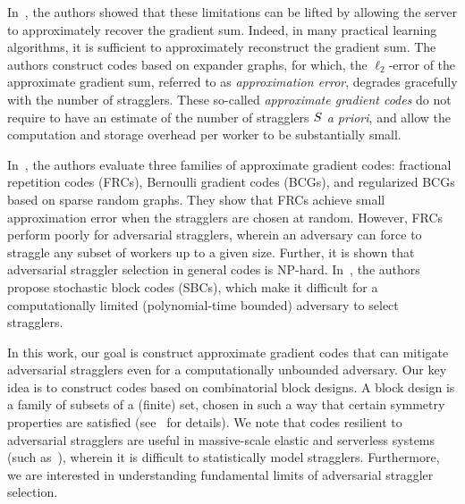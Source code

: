 \documentclass[conference,letterpaper]{IEEEtran}
\begin{document}
In~\cite{Raviv:18}, the authors showed that these limitations can be lifted by allowing the server to approximately recover the gradient sum.
Indeed, in many practical learning algorithms, it is sufficient to approximately reconstruct the gradient sum. 
The authors construct codes based on expander graphs, for which, the $\ell_2$-error of the approximate gradient sum, referred to as {\it approximation error}, degrades gracefully with the number of stragglers.
These so-called {\it approximate gradient codes} 
do not require to have an estimate of the number of stragglers $S$ {\it a priori}, and allow the computation and storage overhead per worker to be substantially small.

In~\cite{CharlesP:17}, the authors evaluate three families of approximate gradient codes: fractional repetition codes (FRCs), Bernoulli gradient codes (BCGs), and regularized BCGs based on sparse random graphs. They show that FRCs achieve small approximation error when the stragglers are chosen at random. However, FRCs perform poorly for adversarial stragglers, wherein an adversary can force to straggle any subset of workers up to a given size. Further, it is shown that adversarial straggler selection in general codes is NP-hard. In~\cite{CharlesP:18}, the authors propose stochastic block codes (SBCs), which make it difficult for a computationally limited (polynomial-time bounded) adversary to select stragglers.

In this work, our goal is construct approximate gradient codes that can mitigate adversarial stragglers even for a computationally unbounded adversary. {Our key idea is to construct codes based on combinatorial block designs. A block design is a family of subsets of a (finite) set, chosen in such a way that certain symmetry properties are satisfied (see~\cite{Stinson:2003} for details)}. We note that codes resilient to adversarial stragglers are useful in massive-scale elastic and serverless systems (such as~\cite{Jonas:17}), wherein it is difficult to statistically model stragglers. Furthermore, we are interested in understanding fundamental limits of adversarial straggler selection. 
\end{document}
